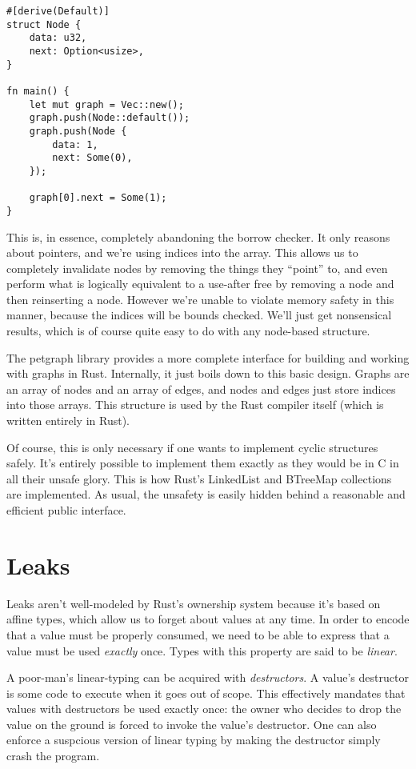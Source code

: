 \begin{verbatim}
#[derive(Default)]
struct Node {
    data: u32,
    next: Option<usize>,
}

fn main() {
    let mut graph = Vec::new();
    graph.push(Node::default());
    graph.push(Node {
        data: 1,
        next: Some(0),
    });

    graph[0].next = Some(1);
}
\end{verbatim}

This is, in essence, completely abandoning the borrow checker. It only reasons
about pointers, and we're using indices into the array. This allows us to
completely invalidate nodes by removing the things they ``point'' to, and even
perform what is logically equivalent to a use-after free by removing a node
and then reinserting a node. However we're unable to violate
memory safety in this manner, because the indices will be bounds checked.
We'll just get nonsensical results, which is of course quite easy to do with
any node-based structure.

The petgraph library \cite{petgraph} provides a more complete interface for
building and working with graphs in Rust. Internally, it just boils down to
this basic design. Graphs are an array of nodes and an array of edges,
and nodes and edges just store indices into those arrays. This structure is
used by the Rust compiler itself (which is written entirely in Rust).

Of course, this is only necessary if one wants to implement cyclic structures
safely. It's entirely possible to implement them exactly as they would be in C
in all their unsafe glory. This is how Rust's LinkedList and BTreeMap
collections are implemented. As usual, the unsafety is easily hidden behind
a reasonable and efficient public interface.





\section{Leaks}

Leaks aren't well-modeled by Rust's ownership system because it's based on affine
types, which allow us to forget about values at any time.
In order to encode that a value must be properly consumed, we need to be able
to express that a value must be used \emph{exactly} once. Types with this property
are said to be \emph{linear}.

A poor-man's linear-typing can be acquired with \emph{destructors}. A value's destructor
is some code to execute when it goes out of scope. This effectively mandates that
values with destructors be used exactly once: the owner who decides to drop the
value on the ground is forced to invoke the value's destructor. One can also enforce
a suspcious version of linear typing by making the destructor simply crash the program.

